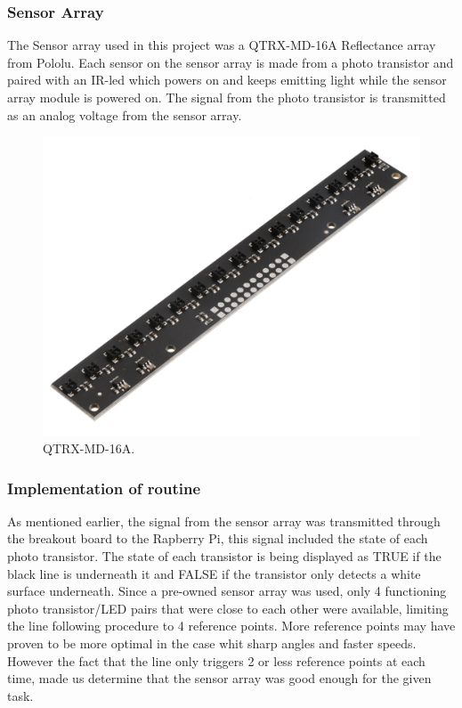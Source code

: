 \subsubsection{Sensor Array}
The Sensor array used in this project was a QTRX-MD-16A Reflectance array from Pololu. Each sensor on the sensor array is made from a photo transistor and paired with an IR-led which powers on and keeps emitting light while the sensor array module is powered on. The signal from the photo transistor is transmitted as an analog voltage from the sensor array.
\begin{figure}[h]
    \centering
    \includegraphics[width =\textwidth]{sections/assets/Sensor_array.jpg}
    \caption{QTRX-MD-16A.}
    \label{Sensor_array}
\end{figure}
\subsubsection{Implementation of routine}
As mentioned earlier, the signal from the sensor array was transmitted through the breakout board to the Rapberry Pi, this signal included the state of each photo transistor. The state of each transistor is being displayed as TRUE if the black line is underneath it and FALSE if the transistor only detects a white surface underneath. Since a pre-owned sensor array was used, only 4 functioning photo transistor/LED pairs that were close to each other were available, limiting the line following procedure to 4 reference points. More reference points may have proven to be more optimal in the case whit sharp angles and faster speeds. However the fact that the line only triggers 2 or less reference points at each time, made us determine that the sensor array was good enough for the given task.

